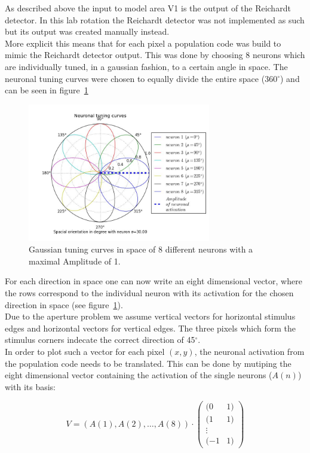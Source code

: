 \documentclass[a4paper]{article}
\begin{document}
As described above the input to model area V1 is the output of the Reichardt detector.
In this lab rotation the Reichardt detector was not implemented as such but its output was created manually instead.\\
More explicit this means that for each pixel a population code was build to mimic the Reichardt detector output. This was done by choosing 8 neurons which are individually tuned, in a gaussian fashion, to a certain angle in space. The neuronal tuning curves were chosen to equally divide the entire space (360$^{\circ}$) and can be seen in figure~\ref{fig:neuronGauss}

\vspace{0.5cm}
\begin{figure}[ht]
\centering
\includegraphics[width=8cm]{pics/neuronGauss}
\caption{Gaussian tuning curves in space of 8 different neurons with a maximal Amplitude of 1.}
\label{fig:neuronGauss}
\end{figure}
\vspace{0.5cm}

For each direction in space one can now write an eight dimensional vector, where the rows correspond to the individual neuron with its activation for the chosen direction in space (see figure~\ref{fig:neuronGauss}).\\
Due to the aperture problem we assume vertical vectors for horizontal stimulus edges and horizontal vectors for vertical edges. The three pixels which form the stimulus corners indecate the correct direction of 45$^{\circ}$.\\
In order to plot such a vector for each pixel $(x,y)$, the neuronal activation from the population code needs to be translated. This can be done by mutiping the eight dimensional vector containing the activation of the single neurons ($A(n)$) with its basis:

\begin{equation}
V=\left(A(1),A(2),\hdots, A(8)\right) \cdot \begin{pmatrix} (0&1) \\ (1&1)\\ \vdots\\ (-1&1)\end{pmatrix}
\label{vector1}
\end{equation}
\end{document}

